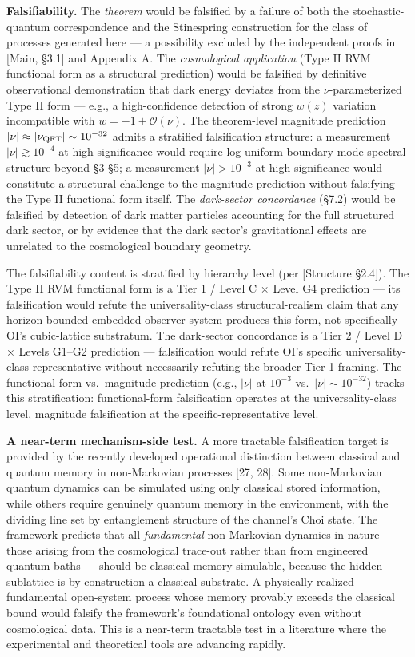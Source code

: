 \documentclass[
]{article}
\begin{document}
\textbf{Falsifiability.} The \emph{theorem} would be falsified by a
failure of both the stochastic-quantum correspondence and the
Stinespring construction for the class of processes generated here --- a
possibility excluded by the independent proofs in {[}Main, §3.1{]} and
Appendix A. The \emph{cosmological application} (Type II RVM functional
form as a structural prediction) would be falsified by definitive
observational demonstration that dark energy deviates from the
\(\nu\)-parameterized Type II form --- e.g., a high-confidence detection
of strong \(w(z)\) variation incompatible with
\(w = -1 + \mathcal{O}(\nu)\). The theorem-level magnitude prediction
\(|\nu| \approx |\nu_{\rm QFT}| \sim 10^{-32}\) admits a stratified
falsification structure: a measurement \(|\nu| \gtrsim 10^{-4}\) at high
significance would require log-uniform boundary-mode spectral structure
beyond §3-§5; a measurement \(|\nu| > 10^{-3}\) at high significance
would constitute a structural challenge to the magnitude prediction
without falsifying the Type II functional form itself. The
\emph{dark-sector concordance} (§7.2) would be falsified by detection of
dark matter particles accounting for the full structured dark sector, or
by evidence that the dark sector's gravitational effects are unrelated
to the cosmological boundary geometry.

The falsifiability content is stratified by hierarchy level (per
{[}Structure §2.4{]}). The Type II RVM functional form is a Tier 1 /
Level C × Level G4 prediction --- its falsification would refute the
universality-class structural-realism claim that any horizon-bounded
embedded-observer system produces this form, not specifically OI's
cubic-lattice substratum. The dark-sector concordance is a Tier 2 /
Level D × Levels G1--G2 prediction --- falsification would refute OI's
specific universality-class representative without necessarily refuting
the broader Tier 1 framing. The functional-form vs.~magnitude prediction
(e.g., \(|\nu|\) at \(10^{-3}\) vs.~\(|\nu| \sim 10^{-32}\)) tracks this
stratification: functional-form falsification operates at the
universality-class level, magnitude falsification at the
specific-representative level.

\textbf{A near-term mechanism-side test.} A more tractable falsification
target is provided by the recently developed operational distinction
between classical and quantum memory in non-Markovian processes {[}27,
28{]}. Some non-Markovian quantum dynamics can be simulated using only
classical stored information, while others require genuinely quantum
memory in the environment, with the dividing line set by entanglement
structure of the channel's Choi state. The framework predicts that all
\emph{fundamental} non-Markovian dynamics in nature --- those arising
from the cosmological trace-out rather than from engineered quantum
baths --- should be classical-memory simulable, because the hidden
sublattice is by construction a classical substrate. A physically
realized fundamental open-system process whose memory provably exceeds
the classical bound would falsify the framework's foundational ontology
even without cosmological data. This is a near-term tractable test in a
literature where the experimental and theoretical tools are advancing
rapidly.
\end{document}
